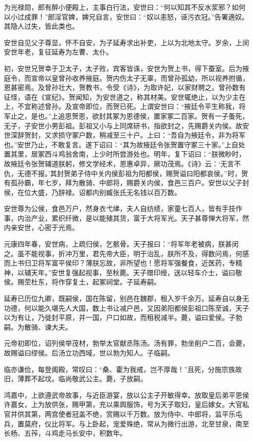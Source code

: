 \documentclass[]{article}
\begin{document}
为光禄勋，郎有醉小便殿上，主事白行法，安世曰：``何以知其不反水浆邪？如何以小过成罪！''郎淫官婢，婢兄自言，安世曰：``奴以恚怒，诬污衣冠。''告署適奴。其隐人过失，皆此类也。

安世自见父子尊显，怀不自安，为子延寿求出补吏，上以为北地太守。岁余，上闵安世年老，复征延寿为左曹、太仆。

初，安世兄贺幸于卫太子，太子败，宾客皆诛，安世为贺上书，得下蚕室。后为掖庭令，而宣帝以皇曾孙收养掖庭。贺内伤太子无辜，而曾孙孤幼，所以视养拊循，恩甚密焉。及曾孙壮大，贺教书，令受《诗》，为取许妃，以家财聘之。曾孙数有征怪，语在《宣纪》。贺闻知，为安世道之，称其材美。安世辄绝止，以为少主在上，不宜称述曾孙。及宣帝即位，而贺已死。上谓安世曰：``掖廷令平生称我，将军止之，是也。''上追思贺恩，欲封其冢为恩德侯，置家冢二百家。贺有一子蚤死，无子，子安世小男彭祖。彭祖又小与上同席研书，指欲封之，先赐爵关内侯。故安世深辞贺封，又求损守冢户数，稍减至三十户。上曰：``吾自为掖廷令，非为将军也。''安世乃止，不敢复言。遂下诏曰：``其为故掖廷令张贺置守冢三十家。''上自处置其里，居冢西斗鸡翁舍南，上少时所尝游处也。明年，复下诏曰：``朕微眇时，故掖廷令张贺辅道朕躬，修文学经术，恩惠卓异，厥功茂焉。《诗》云：`无言不仇，无德不报。'其封贺弟子侍中关内侯彭祖为阳都侯，赐贺谥曰阳都哀侯。''时，贺有孤孙霸，年七岁，拜为散骑、中郎将，赐爵关内侯，食邑三百户。安世以父子封侯，在位大盛，乃辞禄。诏都内别臧张氏无名钱以百万数。

安世尊为公侯，食邑万户，然身衣弋绨，夫人自纺绩，家童七百人，皆有手技作事，内治产业，累织纤微，是以能殖其货，富于大将军光。天子甚尊惮大将军，然内亲安世，心密于光焉。

元康四年春，安世病，上疏归侯，乞骸骨。天子报曰：``将军年老被病，朕甚闵之。虽不能视事，折冲万里，君先帝大臣，明于治乱，朕所不及，得数问焉，何感而上书归卫将军富平侯印？薄朕忘故，非所望也！愿将军强餐食，近医药，专精神，以辅天年。''安世复强起视事，至秋薨。天子赠印绶，送以轻车介士，谥曰敬侯。赐茔杜东，将作穿复土，起冢祠堂。子延寿嗣。

延寿已历位九卿，既嗣侯，国在陈留，别邑在魏郡，租入岁千余万。延寿自以身无功德，何以能久堪先人大国，数上书让减户邑，又因弟阳都侯彭祖口陈至诚，天子以为有让，乃徙封平原，并一国，户口如故，而租税减半。薨，谥曰爱侯。子勃嗣。为散骑、谏大夫。

元帝初即位，诏列侯举茂材，勃举太官献丞陈汤。汤有罪，勃坐削户二百，会薨，故赐谥曰缪侯。后汤立功西域，世以勃为知人。子临嗣。

临亦谦俭，每登阁殿，常叹曰：``桑、霍为我戒，岂不厚哉！''且死，分施宗族故旧，薄葬不起坟。临尚敬武公主。薨，子放嗣。

鸿嘉中，上欲遵武帝故事，与近臣游宴，放以公主子开敏得幸。放取皇后弟平恩侯许嘉女，上为放供张，赐甲第，充以乘舆服饰，号为天子取妇，皇后嫁女。大官私官并供其第，两宫使者冠盖不绝，赏赐以千万数。放为侍中、中郎将，监平乐屯兵，置莫府，仪比将军。与上卧起，宠爱殊绝，常从为微行出游，北至甘泉，南至长杨、五莋，斗鸡走马长安中，积数年。
\end{document}

